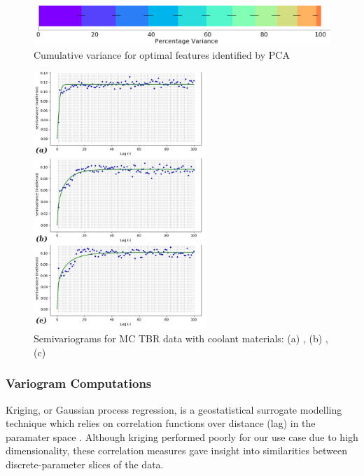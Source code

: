 \begin{figure}[h]
  \centering
    \includegraphics[width=0.6\linewidth]{fig2_pca.jpg}
    \caption{Cumulative variance for optimal features identified by PCA}
  \label{fig:pca}
\end{figure}

\begin{figure}
  \vspace{-30pt}
  \begin{center}
    \hspace*{-.3\columnsep}\includegraphics[width=0.58\textwidth]{fig3_allvar.jpg}
	\caption{Semivariograms for MC TBR data with coolant materials: (a) ,
	(b) , (c) }
    \label{fig:var}
  \end{center}
  \vspace{-50pt}
\end{figure}

\subsubsection{Variogram Computations}


Kriging, or Gaussian process regression, is a geostatistical surrogate modelling technique which relies on correlation functions over distance (lag) in the paramater space \cite{Bouhlel2018}. Although kriging performed poorly for our use case due to high dimensionality, these correlation measures gave insight into similarities between discrete-parameter slices of the data.

